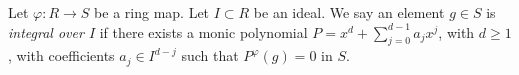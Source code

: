 \begin{definition}
\label{definition-integral-over-ideal}
Let $\varphi : R \to S$ be a ring map.
Let $I \subset R$ be an ideal.
We say an element $g \in S$ is
{\it integral over $I$} if
there exists a monic
polynomial $P = x^d + \sum_{j=0}^{d-1} a_j x^j$, with $d\geq1$,
with coefficients $a_j \in I^{d-j}$ such
that $P^\varphi(g) = 0$ in $S$.
\end{definition}